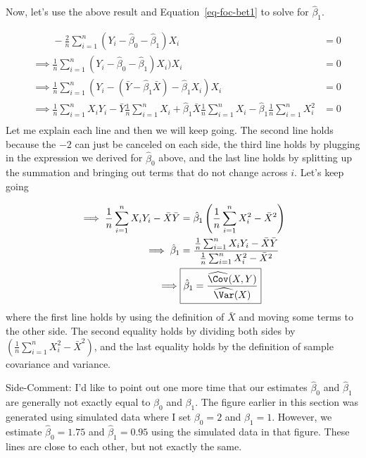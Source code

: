 \documentclass[
  letterpaper,
  DIV=11,
  numbers=noendperiod]{scrreprt}
\begin{document}
Now, let's use the above result and Equation~\ref{eq-foc-bet1} to solve
for \(\hat{\beta}_1\).

\[
  \begin{aligned}
  & \phantom{\implies} -\frac{2}{n} \sum_{i=1}^n (Y_i - \hat{\beta}_0 - \hat{\beta}_1) X_i &= 0 \\
  & \implies  \frac{1}{n} \sum_{i=1}^n (Y_i - \hat{\beta}_0 - \hat{\beta}_1) X_i) X_i &= 0 \\
  & \implies  \frac{1}{n} \sum_{i=1}^n (Y_i - (\bar{Y} - \hat{\beta}_1 \bar{X}) - \hat{\beta}_1 X_i) X_i &= 0 \\
  & \implies  \frac{1}{n} \sum_{i=1}^n X_i Y_i - \bar{Y} \frac{1}{n} \sum_{i=1}^n X_i + \hat{\beta}_1 \bar{X} \frac{1}{n} \sum_{i=1}^n X_i - \hat{\beta}_1 \frac{1}{n} \sum_{i=1}^n X_i^2 &= 0  \\
\end{aligned}
\] Let me explain each line and then we will keep going. The second line
holds because the \(-2\) can just be canceled on each side, the third
line holds by plugging in the expression we derived for
\(\hat{\beta}_0\) above, and the last line holds by splitting up the
summation and bringing out terms that do not change across \(i\). Let's
keep going

\[
\begin{aligned}
  \implies  \frac{1}{n} \sum_{i=1}^n X_i Y_i - \bar{X}\bar{Y} &= \hat{\beta}_1\left(\frac{1}{n} \sum_{i=1}^n X_i^2 - \bar{X}^2 \right) \\
  \implies  \hat{\beta}_1 &= \frac{\frac{1}{n} \sum_{i=1}^n X_i Y_i - \bar{X}\bar{Y}}{\frac{1}{n} \sum_{i=1}^n X_i^2 - \bar{X}^2} \\
  \implies  & \boxed{\hat{\beta}_1 = \frac{\widehat{\Cov}(X,Y)}{\widehat{\Var}(X)}}
  \end{aligned}
\] where the first line holds by using the definition of \(\bar{X}\) and
moving some terms to the other side. The second equality holds by
dividing both sides by
\(\left(\frac{1}{n} \displaystyle \sum_{i=1}^n X_i^2 - \bar{X}^2 \right)\),
and the last equality holds by the definition of sample covariance and
variance.

{Side-Comment:} I'd like to point out one more time that our estimates
\(\hat{\beta}_0\) and \(\hat{\beta}_1\) are generally not exactly equal
to \(\beta_0\) and \(\beta_1\). The figure earlier in this section was
generated using simulated data where I set \(\beta_0=2\) and
\(\beta_1=1\). However, we estimate \(\hat{\beta}_0 = 1.75\) and
\(\hat{\beta}_1 = 0.95\) using the simulated data in that figure. These
lines are close to each other, but not exactly the same.
\end{document}
